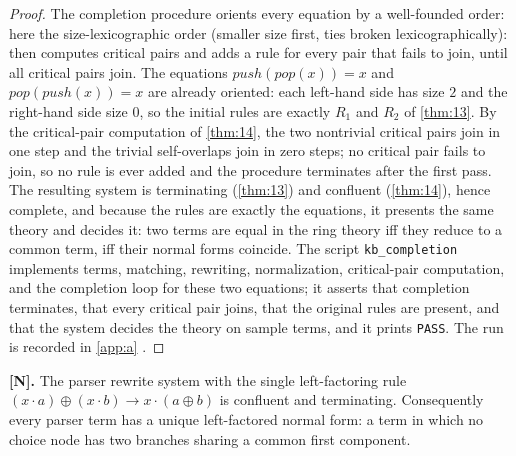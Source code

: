 \begin{proof}
The completion procedure orients every equation by a well-founded order:
here the size-lexicographic order (smaller size first, ties broken
lexicographically): then computes critical pairs and adds a rule for
every pair that fails to join, until all critical pairs join. The equations
$\mathit{push} (\mathit{pop} (x)) = x$ and
$\mathit{pop} (\mathit{push} (x)) = x$ are already oriented: each left-hand
side has size $2$ and the right-hand side size $0$, so the initial rules are
exactly $R_1$ and $R_2$ of \autoref{thm:13}. By the critical-pair computation
of \autoref{thm:14}, the two nontrivial critical pairs join in one step and
the trivial self-overlaps join in zero steps; no critical pair fails to
join, so no rule is ever added and the procedure terminates after the first
pass. The resulting system is terminating (\autoref{thm:13}) and confluent
(\autoref{thm:14}), hence complete, and because the rules are exactly the
equations, it presents the same theory and decides it: two terms are equal
in the ring theory iff they reduce to a common term, iff their normal forms
coincide. The script \texttt{kb\_completion} implements terms, matching,
rewriting, normalization, critical-pair computation, and the completion loop
for these two equations; it asserts that completion terminates, that every
critical pair joins, that the original rules are present, and that the
system decides the theory on sample terms, and it prints \texttt{PASS}. The
run is recorded in \autoref{app:a} \cite{knuthbendix}.
\end{proof}

\begin{theorem}\label{thm:16}
\textbf{[N].} The parser rewrite system with the single left-factoring rule
$(x \cdot a) \oplus (x \cdot b) \to x \cdot (a \oplus b)$ is confluent and
terminating. Consequently every parser term has a unique left-factored
normal form: a term in which no choice node has two branches sharing a
common first component.
\end{theorem}

